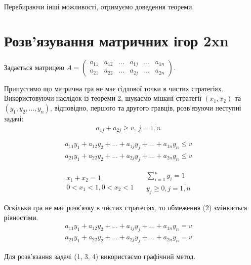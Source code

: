 \documentclass[12pt,a4paper]{book}
\begin{document}
Перебираючи інші можливості, отримуємо доведення теореми.

\section{Розв’язування матричних ігор 2xn}

Задається матрицею $A=\left ( \begin{array}{cccccc}
a_{11}&a_{12}&\dots&a_{1j}&\dots&a_{1n}\\
a_{21}&a_{22}&\dots&a_{2j}&\dots&a_{2n}
\end{array}\right)$.

Припустимо що матрична гра не має сідлової точки в чистих стратегіях. Використовуючи наслідок із теореми 2, шукаємо мішані стратегії $(x_1, x_2)$ та $(y_1,y_2,\dots,y_n)$, відповідно, першого та другого гравців, розв'язуючи неступні задачі:
\begin{equation}
a_{1j}+a_{2j} \ge v, \, j=\overline{1,n}
\end{equation}

\begin{equation}
\begin{array}{l}
a_{11}y_1+a_{12}y_2+\dots+a_{1j}y_j+\dots+a_{1n}y_n \le v\\
a_{21}y_1+a_{22}y_2+\dots+a_{2j}y_j+\dots+a_{2n}y_n \le v
\end{array}
\end{equation}

\begin{equation}
\begin{array}{c}
x_1+x_2=1\\
0<x_1<1, 0<x_2<1
\end{array}
\quad
\begin{array}{c}
\sum_{i=1}^n y_i=1\\
y_j \ge 0, j=\overline{1,n}
\end{array}
\end{equation}

Оскільки гра не має розв'язку в чистих стратегіях, то обмеження (2) змінюється рівностіми.
\begin{equation}
\begin{array}{l}
a_{11}y_1+a_{12}y_2+\dots+a_{1j}y_j+\dots+a_{1n}y_n = v\\
a_{21}y_1+a_{22}y_2+\dots+a_{2j}y_j+\dots+a_{2n}y_n = v
\end{array}
\end{equation}

Для розв'язання задачі (1, 3, 4) використаємо графічний метод.
\end{document}
